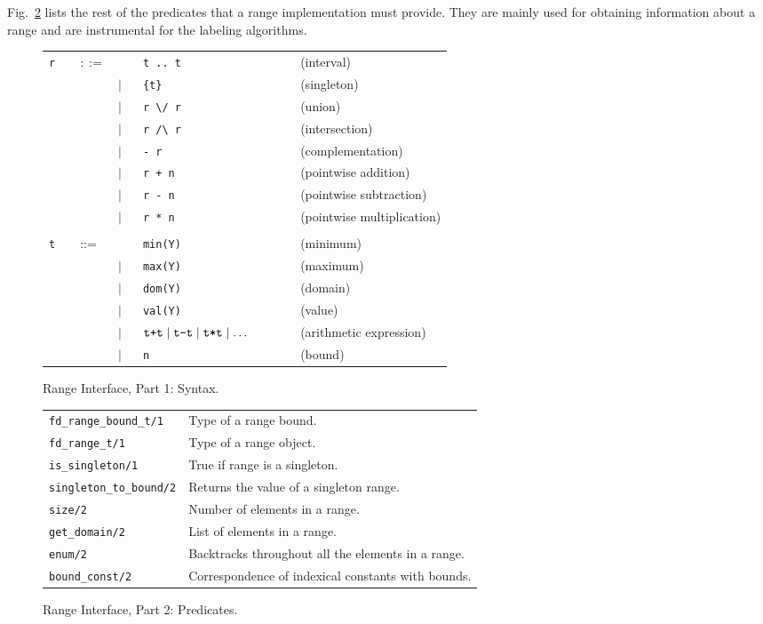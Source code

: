 \documentclass{llncs}
\begin{document}
Fig.~\ref{fig:range:preds} lists the rest of the predicates that a
range implementation must provide. They are mainly used for obtaining
information about a range and are instrumental for the labeling
algorithms.
\begin{figure}[t]
  \centering
  \begin{tabular}{lllllll}
  \verb|r|  && $::=$ & $\quad$ & \verb|t .. t| & $\qquad$ & (interval) \\
&&& $\mid$ &  \verb|{t}| && (singleton) \\
&&& $\mid$ &  \verb|r \/ r| && (union) \\
&&& $\mid$ &  \verb|r /\ r| && (intersection) \\
&&& $\mid$ &  \verb|- r| && (complementation) \\
&&& $\mid$ &  \verb|r + n| && (pointwise addition) \\
&&& $\mid$ &  \verb|r - n| && (pointwise subtraction) \\
&&& $\mid$ &  \verb|r * n| && (pointwise multiplication)\\
\\
\verb|t|  && ::= && \verb|min(Y)|  && (minimum) \\
&&& $\mid$ &\verb|max(Y)| && (maximum) \\
&&& $\mid$ &\verb|dom(Y)|  && (domain) \\
&&& $\mid$ &\verb|val(Y)| && (value) \\
&&& $\mid$ &$\verb|t+t| \mid \verb|t-t| \mid \verb|t*t| \mid \dots $   && (arithmetic expression) \\
&&& $\mid$ &\verb|n|  && (bound) \\
\end{tabular}
  \caption{Range Interface, Part 1: Syntax.}
  \label{fig:range:syntax}
\end{figure}

\begin{figure}[b]
  \centering
  \begin{tabular}{l@{\hspace{0.5cm}}l}
    \verb!fd_range_bound_t/1! &	Type of a range bound.\\
    \verb!fd_range_t/1! & Type of a range object.\\
    \verb!is_singleton/1! & True if range is a singleton.\\
    \verb!singleton_to_bound/2! & Returns the value of a singleton range.\\
    \verb!size/2! & Number of elements in a range.\\
    \verb!get_domain/2! & List of elements in a range.\\
    \verb!enum/2! & Backtracks throughout all the elements in a range.\\
    \verb!bound_const/2! & Correspondence of indexical constants with bounds.\\
  \end{tabular}
  \caption{Range Interface, Part 2: Predicates.}
  \label{fig:range:preds}
\end{figure}
\end{document}
